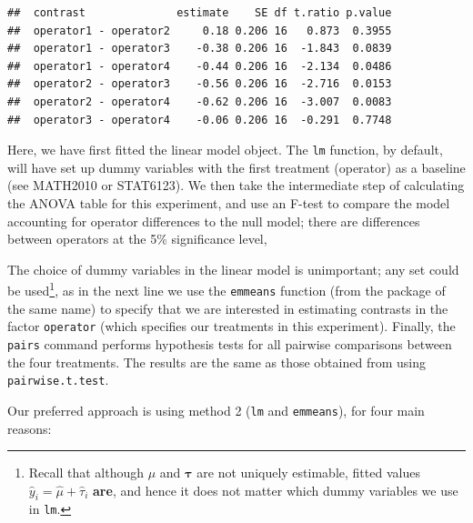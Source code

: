 \documentclass[
]{book}
\theoremstyle{definition}
\theoremstyle{definition}
\theoremstyle{definition}
\theoremstyle{definition}
\theoremstyle{remark}
\begin{document}
\begin{enumerate}
\begin{verbatim}
##  contrast              estimate    SE df t.ratio p.value
##  operator1 - operator2     0.18 0.206 16   0.873  0.3955
##  operator1 - operator3    -0.38 0.206 16  -1.843  0.0839
##  operator1 - operator4    -0.44 0.206 16  -2.134  0.0486
##  operator2 - operator3    -0.56 0.206 16  -2.716  0.0153
##  operator2 - operator4    -0.62 0.206 16  -3.007  0.0083
##  operator3 - operator4    -0.06 0.206 16  -0.291  0.7748
\end{verbatim}

  Here, we have first fitted the linear model object. The \texttt{lm} function, by default, will have set up dummy variables with the first treatment (operator) as a baseline (see MATH2010 or STAT6123). We then take the intermediate step of calculating the ANOVA table for this experiment, and use an F-test to compare the model accounting for operator differences to the null model; there are differences between operators at the 5\% significance level,

  The choice of dummy variables in the linear model is unimportant; any set could be used\footnote{Recall that although \(\mu\) and \(\boldsymbol{\tau}\) are not uniquely estimable, fitted values \(\hat{y}_i = \hat{\mu} + \hat{\tau}_i\) \textbf{are}, and hence it does not matter which dummy variables we use in \texttt{lm}.}, as in the next line we use the \texttt{emmeans} function (from the package of the same name) to specify that we are interested in estimating contrasts in the factor \texttt{operator} (which specifies our treatments in this experiment). Finally, the \texttt{pairs} command performs hypothesis tests for all pairwise comparisons between the four treatments. The results are the same as those obtained from using \texttt{pairwise.t.test}.
\end{enumerate}

Our preferred approach is using method 2 (\texttt{lm} and \texttt{emmeans}), for four main reasons:
\end{document}
